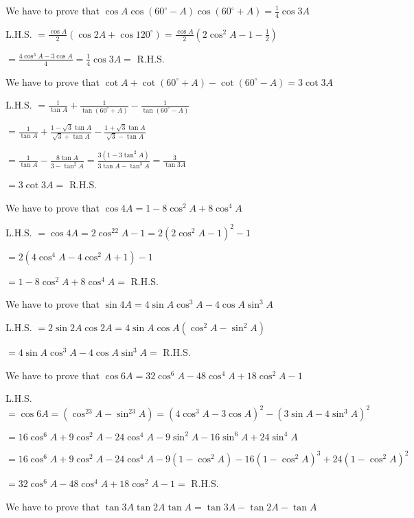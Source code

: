 \item We have to prove that $\cos A\cos(60^\circ - A)\cos(60^\circ + A) = \frac{1}{4}\cos 3A$

  L.H.S. $= \frac{\cos A}{2}\left(\cos 2A + \cos120^\circ\right) = \frac{\cos A}{2}\left(2\cos^2A - 1 - \frac{1}{2}\right)$

  $= \frac{4\cos^3A - 3\cos A}{4} = \frac{1}{4}\cos 3A =$ R.H.S.

\item We have to prove that $\cot A + \cot(60^\circ + A) - \cot(60^\circ - A) = 3\cot 3A$

  L.H.S. $= \frac{1}{\tan A} + \frac{1}{\tan(60^\circ + A)} - \frac{1}{\tan(60^\circ - A)}$

  $= \frac{1}{\tan A} + \frac{1 - \sqrt{3}\tan A}{\sqrt{3} + \tan A} - \frac{1 + \sqrt{3}\tan A}{\sqrt{3} - \tan A}$

  $= \frac{1}{\tan A} - \frac{8\tan A}{3 - \tan^2A} = \frac{3(1 - 3\tan^2A)}{3\tan A - \tan^3A} = \frac{3}{\tan 3A}$

  $= 3\cot 3A =$ R.H.S.

\item We have to prove that $\cos 4A = 1 - 8\cos^2A + 8\cos^4A$

  L.H.S. $= \cos 4A = 2\cos^22A - 1 = 2(2\cos^2A - 1)^2 - 1$

  $=2(4\cos^4A - 4\cos^2A + 1) - 1$

  $= 1 - 8\cos^2A + 8\cos^4A =$ R.H.S.

\item We have to prove that $\sin 4A = 4\sin A\cos^3A - 4\cos A\sin^3A$

  L.H.S. $= 2\sin 2A\cos 2A = 4\sin A\cos A(\cos^2A - \sin^2A)$

  $= 4\sin A\cos^3A - 4\cos A\sin^3A =$ R.H.S.

\item We have to prove that $\cos 6A = 32\cos^6A - 48\cos^4A + 18\cos^2A - 1$

  L.H.S. $= \cos 6A = (\cos^23A - \sin^23A) = (4\cos^3A - 3\cos A)^2 - (3\sin A - 4\sin^3A)^2$

  $= 16\cos^6A + 9\cos^2A -24\cos^4A - 9\sin^2A - 16\sin^6A + 24\sin^4A$

  $= 16\cos^6A + 9\cos^2A -24\cos^4A - 9(1 - \cos^2A) - 16(1 - \cos^2A)^3 + 24(1 - \cos^2A)^2$

  $= 32\cos^6A - 48\cos^4A + 18\cos^2A - 1 =$ R.H.S.

\item We have to prove that $\tan 3A\tan 2A\tan A = \tan 3A - \tan 2A - \tan A$

